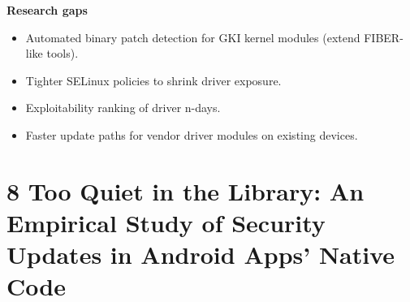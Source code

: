 \documentclass[11pt,a4paper]{article}
\begin{document}
\begin{enumerate}
    \vspace{4pt}
    \textbf{Research gaps}
    \begin{itemize}
        \item Automated binary patch detection for GKI kernel modules (extend FIBER-like tools).
        \item Tighter SELinux policies to shrink driver exposure.
        \item Exploitability ranking of driver n-days.
        \item Faster update paths for vendor driver modules on existing devices.
    \end{itemize}

\end{enumerate}

\newpage

\section{8 Too Quiet in the Library: An Empirical Study of Security Updates in Android Apps' Native Code}
\end{document}

